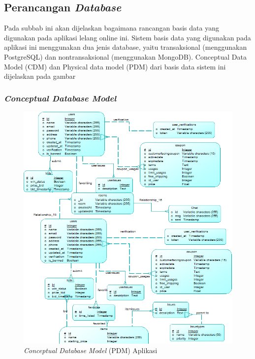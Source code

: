 
\subsection{Perancangan \textit{Database}}
Pada subbab ini akan dijelaskan bagaimana rancangan basis data yang digunakan pada aplikasi lelang online ini. Sistem basis data yang digunakan pada aplikasi ini menggunakan dua jenis database, yaitu transaksional (menggunakan PostgreSQL) dan nontransaksional (menggunakan MongoDB). Conceptual Data Model (CDM) dan Physical data model (PDM) dari basis data sistem ini dijelaskan pada gambar 
	\subsubsection{\textit{Conceptual Database Model}}
	\begin{figure}[H]
		\centering
		\includegraphics[width=\textwidth]{images/bab3/db/cdm.png}
		\caption{\textit{Conceptual Database Model} (PDM) Aplikasi}
		\label{cdm}
	\end{figure}
	
	
